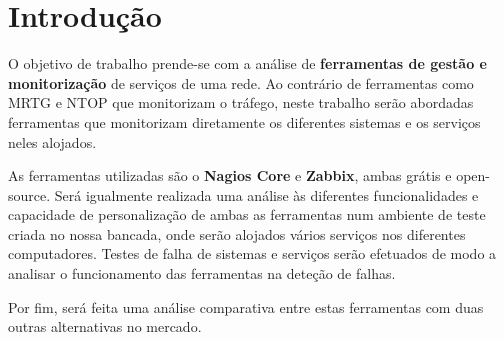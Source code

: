 \chapter{Introdução} \label{sec:intro}

O objetivo de trabalho prende-se com a análise de \textbf{ferramentas de gestão e monitorização} de serviços de uma rede.
Ao contrário de ferramentas como MRTG e NTOP que monitorizam o tráfego, neste trabalho serão abordadas ferramentas que monitorizam diretamente os diferentes sistemas e os serviços neles alojados.

As ferramentas utilizadas são o \textbf{Nagios Core} e \textbf{Zabbix}, ambas grátis e open-source.
Será igualmente realizada uma análise às diferentes funcionalidades e capacidade de personalização de ambas as ferramentas num ambiente de teste criada no nossa bancada, onde serão alojados vários serviços nos diferentes computadores.
Testes de falha de sistemas e serviços serão efetuados de modo a analisar o funcionamento das ferramentas na deteção de falhas.

Por fim, será feita uma análise comparativa entre estas ferramentas com duas outras alternativas no mercado.

